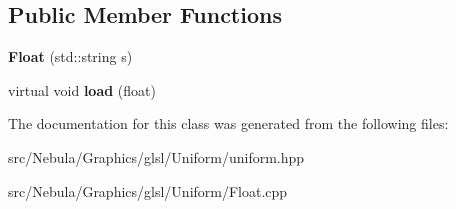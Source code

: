 \subsection*{\-Public \-Member \-Functions}
\begin{DoxyCompactItemize}
\item 
\hypertarget{classNeb_1_1glsl_1_1Uniform_1_1Scalar_1_1Float_a98cbc3f3264a8c007ae4bc942a0e552a}{{\bfseries \-Float} (std\-::string s)}\label{classNeb_1_1glsl_1_1Uniform_1_1Scalar_1_1Float_a98cbc3f3264a8c007ae4bc942a0e552a}

\item 
\hypertarget{classNeb_1_1glsl_1_1Uniform_1_1Scalar_1_1Float_a164add400fc3572a72ac8ea4a6fe7860}{virtual void {\bfseries load} (float)}\label{classNeb_1_1glsl_1_1Uniform_1_1Scalar_1_1Float_a164add400fc3572a72ac8ea4a6fe7860}

\end{DoxyCompactItemize}


\-The documentation for this class was generated from the following files\-:\begin{DoxyCompactItemize}
\item 
src/\-Nebula/\-Graphics/glsl/\-Uniform/uniform.\-hpp\item 
src/\-Nebula/\-Graphics/glsl/\-Uniform/\-Float.\-cpp\end{DoxyCompactItemize}
